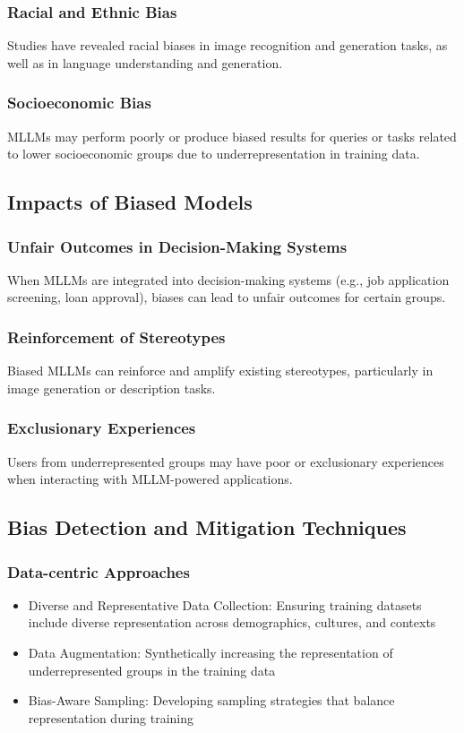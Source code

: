 \subsubsection{Racial and Ethnic Bias}
Studies have revealed racial biases in image recognition and generation tasks, as well as in language understanding and generation.

\subsubsection{Socioeconomic Bias}
MLLMs may perform poorly or produce biased results for queries or tasks related to lower socioeconomic groups due to underrepresentation in training data.

\subsection{Impacts of Biased Models}
\subsubsection{Unfair Outcomes in Decision-Making Systems}
When MLLMs are integrated into decision-making systems (e.g., job application screening, loan approval), biases can lead to unfair outcomes for certain groups.

\subsubsection{Reinforcement of Stereotypes}
Biased MLLMs can reinforce and amplify existing stereotypes, particularly in image generation or description tasks.

\subsubsection{Exclusionary Experiences}
Users from underrepresented groups may have poor or exclusionary experiences when interacting with MLLM-powered applications.

\subsection{Bias Detection and Mitigation Techniques}
\subsubsection{Data-centric Approaches}
\begin{itemize}
    \item Diverse and Representative Data Collection: Ensuring training datasets include diverse representation across demographics, cultures, and contexts
    \item Data Augmentation: Synthetically increasing the representation of underrepresented groups in the training data
    \item Bias-Aware Sampling: Developing sampling strategies that balance representation during training
\end{itemize}

